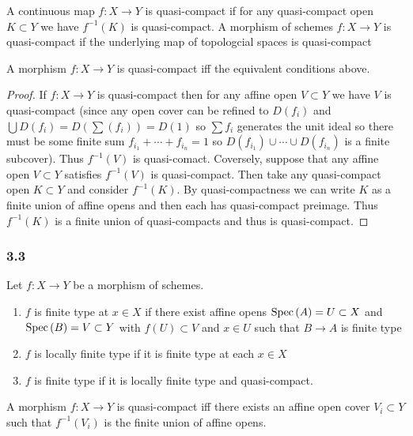 \documentclass[12pt]{article}
\begin{document}
\begin{definition}
A continuous map $f : X \to Y$ is quasi-compact if for any quasi-compact open $K \subset Y$ we have $f^{-1}(K)$ is quasi-compact. A morphism of schemes $f : X \to Y$ is quasi-compact if the underlying map of topologcial spaces is quasi-compact
\end{definition}  

\begin{theorem}
A morphism $f : X \to Y$ is quasi-compact iff the equivalent conditions above.
\end{theorem}

\begin{proof}
If $f : X \to Y$ is quasi-compact then for any affine open $V \subset Y$ we have $V$ is quasi-compact (since any open cover can be refined to $D(f_i)$ and $\bigcup D(f_i) = D(\sum (f_i) ) = D(1)$ so $\sum f_i$ generates the unit ideal so there must be some finite sum $f_{i_1} + \cdots + f_{i_n} = 1$ so $D(f_{i_1}) \cup \cdots \cup D(f_{i_n})$ is a finite subcover). Thus $f^{-1}(V)$ is quasi-comact. Coversely, suppose that any affine open $V \subset Y$ satisfies $f^{-1}(V)$ is quasi-compact. Then take any quasi-compact open $K \subset Y$ and consider $f^{-1}(K)$. By quasi-compactness we can write $K$ as a finite union of affine opens and then each has quasi-compact preimage. Thus $f^{-1}(K)$ is a finite union of quasi-compacts and thus is quasi-compact.
\end{proof}


\subsubsection{3.3}

\begin{definition}
Let $f : X \to Y$ be a morphism of schemes.
\begin{enumerate}
\item $f$ is finite type at $x \in X$ if there exist affine opens $\mathrm{Spec}\left( A \right) = U \subset X$ and $\mathrm{Spec}\left( B \right) = V \subset Y$ with $f(U) \subset V$ and $x \in U$ such that $B \to A$ is finite type
\item $f$ is locally finite type if it is finite type at each $x \in X$
\item $f$ is finite type if it is locally finite type and quasi-compact.
\end{enumerate}
\end{definition}

\begin{lemma}
A morphism $f : X \to Y$ is quasi-compact iff there exists an affine open cover $V_i \subset Y$  such that $f^{-1}(V_i)$ is the finite union of affine opens. 
\end{lemma}
\end{document}
